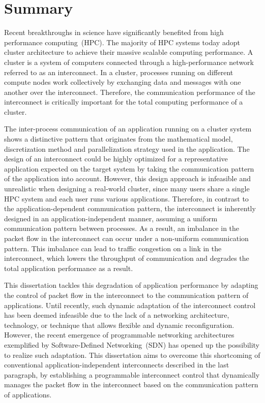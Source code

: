 \pagestyle{myheadings}
\markright{}
\chapter*{Summary}

Recent breakthroughs in science have significantly benefited from high
performance computing~(HPC). The majority of HPC systems today adopt cluster
architecture to achieve their massive scalable computing performance. A
cluster is a system of computers connected through a high-performance network
referred to as an interconnect. In a cluster, processes running on different
compute nodes work collectively by exchanging data and messages with one
another over the interconnect. Therefore, the communication performance of the
interconnect is critically important for the total computing performance of a
cluster.

The inter-process communication of an application running on a cluster system
shows a distinctive pattern that originates from the mathematical model,
discretization method and parallelization strategy used in the application.
The design of an interconnect could be highly optimized for a representative
application expected on the target system by taking the communication pattern
of the application into account. However, this design approach is infeasible
and unrealistic when designing a real-world cluster, since many users share a
single HPC system and each user runs various applications. Therefore, in
contrast to the application-dependent communication pattern, the interconnect
is inherently designed in an application-independent manner, assuming a
uniform communication pattern between processes. As a result, an imbalance in
the packet flow in the interconnect can occur under a non-uniform
communication pattern. This imbalance can lead to traffic congestion on a link
in the interconnect, which lowers the throughput of communication and degrades
the total application performance as a result.

This dissertation tackles this degradation of application performance by
adapting the control of packet flow in the interconnect to the communication
pattern of applications. Until recently, such dynamic adaptation of the
interconnect control has been deemed infeasible due to the lack of a
networking architecture, technology, or technique that allows flexible and
dynamic reconfiguration. However, the recent emergence of programmable
networking architectures exemplified by Software-Defined Networking~(SDN) has
opened up the possibility to realize such adaptation. This dissertation aims
to overcome this shortcoming of conventional application-independent
interconnects described in the last paragraph, by establishing a programmable
interconnect control that dynamically manages the packet flow in the
interconnect based on the communication pattern of applications.

